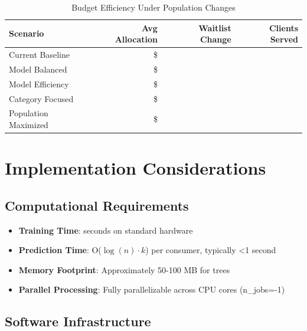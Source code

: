 \begin{table}[h]
\centering
\caption{Budget Efficiency Under Population Changes}
\begin{tabular}{lrrr}
\toprule
\textbf{Scenario} & \textbf{Avg Allocation} & \textbf{Waitlist Change} & \textbf{Clients Served} \\
\midrule
Current Baseline & \$\ModelNinePopcurrentbaselineAvgAlloc{} & \ModelNinePopcurrentbaselineWaitlistChange{} & \ModelNinePopcurrentbaselineClients{} \\
Model Balanced & \$\ModelNinePopmodelbalancedAvgAlloc{} & \ModelNinePopmodelbalancedWaitlistChange{} & \ModelNinePopmodelbalancedClients{} \\
Model Efficiency & \$\ModelNinePopmodelefficiencyAvgAlloc{} & \ModelNinePopmodelefficiencyWaitlistChange{} & \ModelNinePopmodelefficiencyClients{} \\
Category Focused & \$\ModelNinePopcategoryfocusedAvgAlloc{} & \ModelNinePopcategoryfocusedWaitlistChange{} & \ModelNinePopcategoryfocusedClients{} \\
Population Maximized & \$\ModelNinePoppopulationmaximizedAvgAlloc{} & \ModelNinePoppopulationmaximizedWaitlistChange{} & \ModelNinePoppopulationmaximizedClients{} \\
\bottomrule
\end{tabular}
\label{tab:model9_scenarios}
\end{table}
\section{Implementation Considerations}

\subsection{Computational Requirements}

\begin{itemize}
    \item \textbf{Training Time}: \ModelNineTrainingTime{} seconds on standard hardware
    \item \textbf{Prediction Time}: O($\log(n) \cdot k$) per consumer, typically <1 second
    \item \textbf{Memory Footprint}: Approximately 50-100 MB for \ModelNineNTrees{} trees
    \item \textbf{Parallel Processing}: Fully parallelizable across CPU cores (n\_jobs=-1)
\end{itemize}

\subsection{Software Infrastructure}

